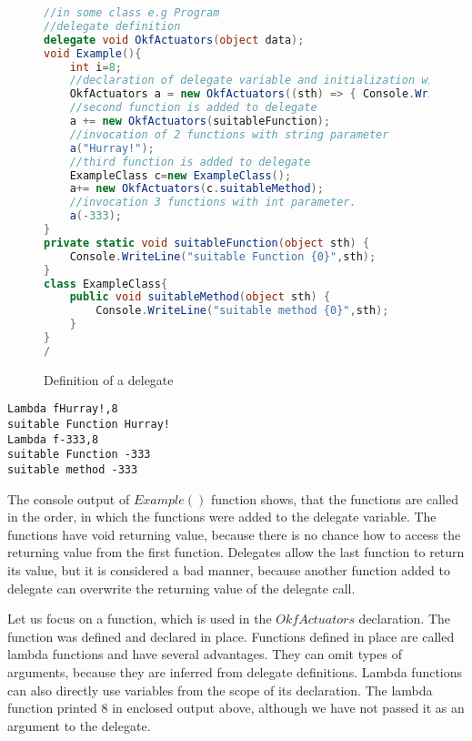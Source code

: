 \begin{figure}[!hbp]
\begin{lstlisting}[language=cs]
//in some class e.g Program
//delegate definition
delegate void OkfActuators(object data);
void Example(){
	int i=8;
	//declaration of delegate variable and initialization with lambda function
	OkfActuators a = new OkfActuators((sth) => { Console.WriteLine("Lambda f{0},{1}",sth,i); });
	//second function is added to delegate
	a += new OkfActuators(suitableFunction);
	//invocation of 2 functions with string parameter
	a("Hurray!");
	//third function is added to delegate
	ExampleClass c=new ExampleClass();
	a+= new OkfActuators(c.suitableMethod);
	//invocation 3 functions with int parameter.
	a(-333);
}
private static void suitableFunction(object sth) { 
	Console.WriteLine("suitable Function {0}",sth);
}
class ExampleClass{
	public void suitableMethod(object sth) { 	
		Console.WriteLine("suitable method {0}",sth);	
	}
}
/\end{lstlisting}
\caption{Definition of a delegate} \label{deleg}
\end{figure}

\begin{verbatim}
Lambda fHurray!,8
suitable Function Hurray!
Lambda f-333,8
suitable Function -333
suitable method -333
\end{verbatim}

	The console output of $Example()$ function shows, that the functions are called in the order, in
	which the functions were added to the delegate variable. 
	The functions have void returning value, because there is no chance how to access
	the returning value from the first function. Delegates allow the last function to return its value, 
	but it is considered a bad manner, because
	another function added to delegate can overwrite the returning value of the delegate call.

	Let us focus on a function, which is used in the $OkfActuators$ declaration. The function 
	was defined and declared in place. Functions defined in place are called lambda functions 
	and have several advantages. 
	They can omit types of arguments, because they are inferred from delegate definitions. Lambda functions
	can also directly use variables from the scope of its declaration. The lambda function printed 8 in enclosed output above,
	although we have not passed it as an argument to the delegate.

